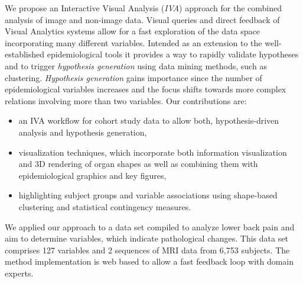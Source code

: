 \documentclass[journal]{style/vgtc} 			          %
\begin{document}
We propose an Interactive Visual Analysis (\emph{IVA}) approach \cite{Thomas2005} for the combined analysis of image and non-image data.
%
Visual queries and direct feedback of Visual Analytics systems allow for a fast exploration of the data space incorporating many different variables.
%
Intended as an extension to the well-established epidemiological tools it provides a way to rapidly validate hypotheses and to trigger \emph{hypothesis generation} using data mining methods, such as clustering.
%
\emph{Hypothesis generation} gains importance since the number of epidemiological variables increases and the focus shifts towards more complex relations involving more than two variables. Our contributions are:
\begin{itemize} \itemsep0.1em
	\item an IVA workflow for cohort study data to allow both, hypothesis-driven analysis and hypothesis generation,%
	\item visualization techniques, which incorporate both information visualization and 3D rendering of organ shapes as well as combining them with epidemiological graphics and key figures,
	\item highlighting subject groups and variable associations using shape-based clustering and statistical contingency measures.
\end{itemize}
We applied our approach to a data set compiled to analyze lower back pain and aim to determine variables, which indicate pathological changes.
%
This data set comprises 127 variables and 2 sequences of MRI data from 6,753 subjects.
%
The method implementation is web based to allow a fast feedback loop with domain experts.
%
\end{document}
